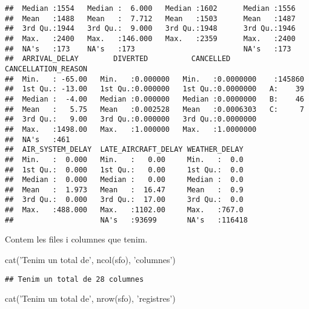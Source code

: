 \documentclass[
]{article}
\newenvironment{Shaded}{\begin{snugshade}}{\end{snugshade}}
\newcommand{\KeywordTok}[1]{\textcolor[rgb]{0.94,0.87,0.69}{#1}}
\newcommand{\NormalTok}[1]{\textcolor[rgb]{0.80,0.80,0.80}{#1}}
\newcommand{\StringTok}[1]{\textcolor[rgb]{0.80,0.58,0.58}{#1}}
\begin{document}
\begin{verbatim}
##  Median :1554   Median :  6.000   Median :1602      Median :1556  
##  Mean   :1488   Mean   :  7.712   Mean   :1503      Mean   :1487  
##  3rd Qu.:1944   3rd Qu.:  9.000   3rd Qu.:1948      3rd Qu.:1946  
##  Max.   :2400   Max.   :146.000   Max.   :2359      Max.   :2400  
##  NA's   :173    NA's   :173                         NA's   :173   
##  ARRIVAL_DELAY        DIVERTED          CANCELLED         CANCELLATION_REASON
##  Min.   : -65.00   Min.   :0.000000   Min.   :0.0000000    :145860           
##  1st Qu.: -13.00   1st Qu.:0.000000   1st Qu.:0.0000000   A:    39           
##  Median :  -4.00   Median :0.000000   Median :0.0000000   B:    46           
##  Mean   :   5.75   Mean   :0.002528   Mean   :0.0006303   C:     7           
##  3rd Qu.:   9.00   3rd Qu.:0.000000   3rd Qu.:0.0000000                      
##  Max.   :1498.00   Max.   :1.000000   Max.   :1.0000000                      
##  NA's   :461                                                                 
##  AIR_SYSTEM_DELAY  LATE_AIRCRAFT_DELAY WEATHER_DELAY   
##  Min.   :  0.000   Min.   :   0.00     Min.   :  0.0   
##  1st Qu.:  0.000   1st Qu.:   0.00     1st Qu.:  0.0   
##  Median :  0.000   Median :   0.00     Median :  0.0   
##  Mean   :  1.973   Mean   :  16.47     Mean   :  0.9   
##  3rd Qu.:  0.000   3rd Qu.:  17.00     3rd Qu.:  0.0   
##  Max.   :488.000   Max.   :1102.00     Max.   :767.0   
##                    NA's   :93699       NA's   :116418
\end{verbatim}

Contem les files i columnes que tenim.

\begin{Shaded}
\begin{Highlighting}[]
\KeywordTok{cat}\NormalTok{(}\StringTok{'Tenim un total de'}\NormalTok{, }\KeywordTok{ncol}\NormalTok{(sfo), }\StringTok{'columnes'}\NormalTok{)}
\end{Highlighting}
\end{Shaded}

\begin{verbatim}
## Tenim un total de 28 columnes
\end{verbatim}

\begin{Shaded}
\begin{Highlighting}[]
\KeywordTok{cat}\NormalTok{(}\StringTok{'Tenim un total de'}\NormalTok{, }\KeywordTok{nrow}\NormalTok{(sfo), }\StringTok{'registres'}\NormalTok{)}
\end{Highlighting}
\end{Shaded}
\end{document}
